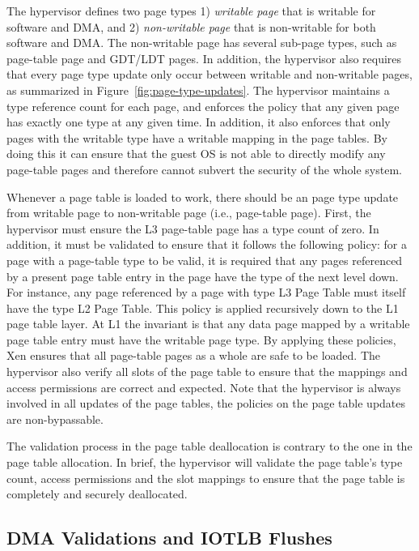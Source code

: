 The hypervisor defines two page types 1) \emph{writable page} that is writable for software and DMA, and 2) \emph{non-writable page} that is non-writable for both software and DMA.
The non-writable page has several sub-page types, such as page-table page and GDT/LDT pages.
In addition, the hypervisor also requires that every page type update only occur between writable and non-writable pages, as summarized in Figure~\ref{fig:page-type-updates}.
The hypervisor maintains a type reference count for each page, and enforces the policy that any given page has exactly one type at any given time. 
In addition, it also enforces that only pages with the writable type have a writable mapping in the page tables.
By doing this it can ensure that the guest OS is not able to directly modify any page-table pages and therefore cannot subvert the security of the whole system.

Whenever a page table is loaded to work, there should be an page type update from writable page to non-writable page (i.e., page-table page).
First, the hypervisor must ensure the L3 page-table page has a type count of zero.
In addition, it must be validated to ensure that it follows the following policy:
for a page with a page-table type to be valid, it is required that any pages referenced
by a present page table entry in the page have the type of the next level down.
For instance, any page referenced by a page with type L3 Page Table must itself have the type L2 Page Table.
This policy is applied recursively down to the L1 page table layer.
At L1 the invariant is that any data page mapped by a writable page table entry must have the writable page type.
By applying these policies, Xen ensures that all page-table pages as a whole are safe to be loaded.
The hypervisor also verify all slots of the page table to ensure that the mappings and access permissions are correct and expected.
Note that the hypervisor is always involved in all updates of the page tables, the policies on the page table updates are non-bypassable.

The validation process in the page table deallocation is contrary to the one in the page table allocation.
In brief, the hypervisor will validate the page table's type count, access permissions and the slot mappings to ensure that the page table is completely and securely deallocated.

\subsection{DMA Validations and IOTLB Flushes}
